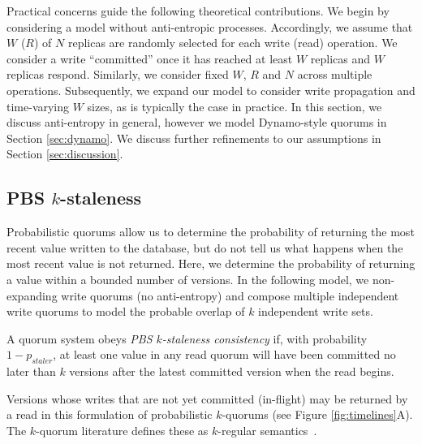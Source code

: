 \documentclass{vldb}
\begin{document}
Practical concerns guide the following theoretical contributions.  We
begin by considering a model without anti-entropic processes.
Accordingly, we assume that $W$ ($R$) of $N$ replicas are randomly
selected for each write (read) operation.  We consider a write
``committed'' once it has reached at least $W$ replicas and $W$ replicas
respond.  Similarly, we consider fixed $W$, $R$ and $N$ across
multiple operations. Subsequently, we expand our model to consider
write propagation and time-varying $W$ sizes, as is typically the case
in practice.  In this section, we discuss anti-entropy in general,
however we model Dynamo-style quorums in Section
\ref{sec:dynamo}. We discuss further refinements to our
assumptions in Section \ref{sec:discussion}.

\subsection{PBS $k$-staleness}

Probabilistic quorums allow us to determine the probability of
returning the most recent value written to the database, but do not
tell us what happens when the most recent value is not returned.
Here, we determine the probability of returning a value within a
bounded number of versions.  In the following model, we non-expanding 
write quorums (no anti-entropy) and compose multiple independent write
quorums to model the probable overlap of $k$ independent write sets.
\begin{definition}
A quorum system obeys \textit{PBS $k$-staleness consistency} if, with
probability $1-p_{staler}$, at least one value in any read quorum will
have been committed no later than $k$ versions after the latest committed
version when the read begins.
\end{definition}
Versions whose writes that are not yet committed (in-flight) may be
returned by a read in this formulation of probabilistic $k$-quorums
(see Figure \ref{fig:timelines}A).  The $k$-quorum literature defines
these as $k$-regular semantics~\cite{non-strict}.
\end{document}
